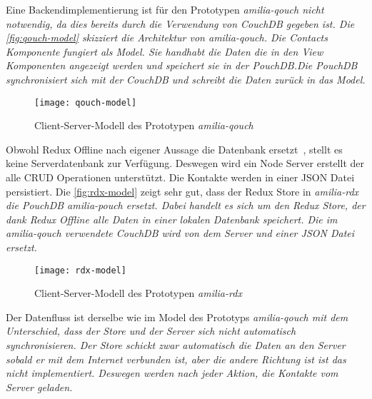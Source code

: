 %
% 
%
Eine Backendimplementierung ist für den Prototypen \it{amilia-qouch} nicht notwendig, da dies bereits durch die Verwendung von CouchDB gegeben ist.
Die \autoref{fig:qouch-model} skizziert die Architektur von \it{amilia-qouch}. Die Contacts Komponente fungiert als Model. Sie handhabt die Daten die in den View Komponenten angezeigt werden und speichert sie in der PouchDB.Die PouchDB synchronisiert sich mit der CouchDB und schreibt die Daten zurück in das Model.  
\begin{figure}[H]
  \centering
  \texttt{[image: qouch-model]}
  \grayRule
  \caption{Client-Server-Modell des Prototypen \it{amilia-qouch}}
  \label{fig:qouch-model}
\end{figure}
%
Obwohl Redux Offline nach eigener Aussage die Datenbank ersetzt~\cite{redux-offline}, stellt es keine Serverdatenbank zur Verfügung.
Deswegen wird ein Node Server erstellt der alle \gls{CRUD} Operationen unterstützt. Die Kontakte werden in einer \gls{JSON} Datei persistiert.
Die \autoref{fig:rdx-model} zeigt sehr gut, dass der Redux Store in \it{amilia-rdx} die PouchDB \it{amilia-pouch} ersetzt.
Dabei handelt es sich um den Redux Store, der dank Redux Offline alle Daten in einer lokalen Datenbank speichert.
Die im \it{amilia-qouch} verwendete CouchDB wird von dem Server und einer \gls{JSON} Datei ersetzt.
%
\begin{figure}[ht]
  \centering
  \texttt{[image: rdx-model]}
  \grayRule
  \caption{Client-Server-Modell des Prototypen \it{amilia-rdx}}
  \label{fig:rdx-model}
\end{figure}
% 
Der Datenfluss ist derselbe wie im Model des Prototyps \it{amilia-qouch} mit dem Unterschied, dass der Store und der Server sich nicht automatisch synchronisieren.
Der Store schickt zwar automatisch die Daten an den Server sobald er mit dem Internet verbunden ist, aber die andere Richtung ist ist das nicht implementiert.
Deswegen werden nach jeder Aktion, die Kontakte vom Server geladen.
